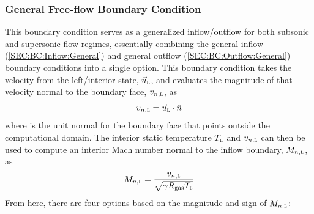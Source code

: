 \subsubsection{General Free-flow Boundary Condition}
\label{SEC:BC:Farfield:General}

This boundary condition serves as a generalized inflow\slash outflow for both
subsonic and supersonic flow regimes, essentially combining the general inflow
(\ref{SEC:BC:Inflow:General}) and general outflow (\ref{SEC:BC:Outflow:General})
boundary conditions into a single option.
%
This boundary condition takes the velocity from the left\slash interior state,
$\vec{u}_{\textsc{l}}$, and evaluates the magnitude of that velocity normal to the
boundary face, $v_{n,\textsc{l}}$, as
%
\[
  v_{n,\textsc{l}} = \vec{u}_{\textsc{l}}\cdot\hat{n}
\]
%
where \normal{} is the unit normal for the boundary face that points outside the
computational domain.
%
The interior static temperature $T_{\textsc{l}}$ and $v_{n,\textsc{l}}$ can then be used to
compute an interior Mach number normal to the inflow boundary, $M_{n,\textsc{l}}$, as
%
\[
  M_{n,\textsc{l}} = \frac{v_{n,\textsc{l}}}{\sqrt{\gamma R_{\textrm{gas}} T_{\textsc{l}}}}
\]
%
From here, there are four options based on the magnitude and sign of
$M_{n,\textsc{l}}$:
%
